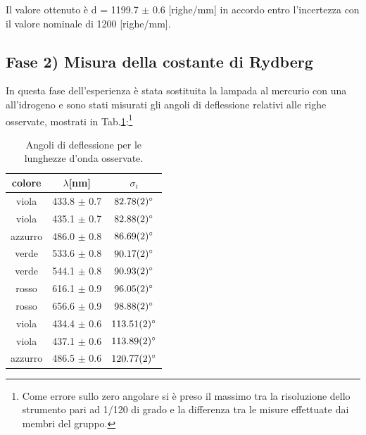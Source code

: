\documentclass[10pt,a4paper]{article}
\begin{document}
\noindent Il  valore ottenuto è d = 1199.7 $\pm$ 0.6 [righe/mm] in accordo entro l'incertezza con il valore nominale di 1200 [righe/mm].

\newpage
\subsection*{Fase 2) Misura della costante di Rydberg}
In questa fase dell'esperienza è stata sostituita la lampada al mercurio con una all'idrogeno e sono stati misurati gli angoli di deflessione relativi alle righe osservate, mostrati in Tab.\ref{tab:r}:\footnote{Come errore sullo zero angolare si è preso il massimo tra la risoluzione dello strumento pari ad 1/120 di grado e la differenza tra le misure effettuate dai membri del gruppo.}

\begin{table}[h]
        \centering
        \begin{tabular}{ccc}
        colore&$ \lambda $[nm]&$\sigma_i $\\\hline\hline
        viola&433.8 $\pm$ 0.7&$\ang{82.78\pm0.02}$\\
        viola&435.1 $\pm$ 0.7&$\ang{82.88\pm0.02}$\\
        azzurro&486.0 $\pm$ 0.8&$\ang{86.69\pm0.02}$\\
        verde&533.6 $\pm$ 0.8&$\ang{90.17\pm0.02}$\\
        verde&544.1 $\pm$ 0.8&$\ang{90.93\pm0.02}$\\
        rosso&616.1 $\pm$ 0.9&$\ang{96.05\pm0.02}$\\
        rosso&656.6 $\pm$ 0.9&$\ang{98.88\pm0.02}$\\
        viola&434.4 $\pm$ 0.6&$\ang{113.51\pm0.02}$\\
        viola&437.1 $\pm$ 0.6&$\ang{113.89\pm0.02}$\\
        azzurro&486.5 $\pm$ 0.6&$\ang{120.77\pm0.02}$\\\hline
        \end{tabular}
        \caption{Angoli di deflessione per le lunghezze d'onda osservate.}
        \label{tab:r}
    \end{table}
    
\end{document}
